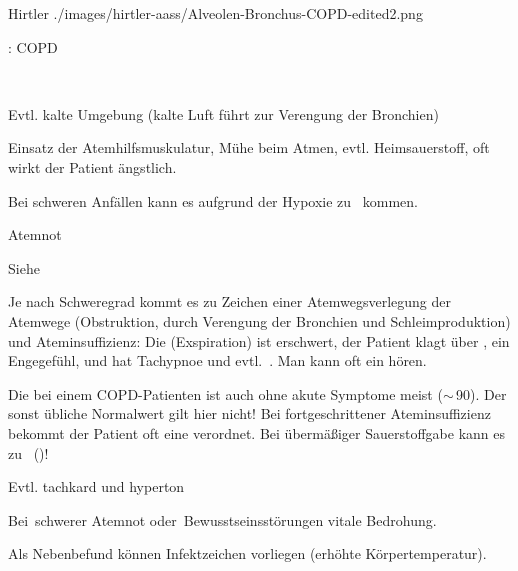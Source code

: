 {}
{\label{fig:copd-veraenderungen}}
{Hirtler}
{}
{./images/hirtler-aass/Alveolen-Bronchus-COPD-edited2.png}
{}





\TextSlide
{\TxABCDE: COPD}
{~
\begin{ABCDEText}
  \item[\ABCDE{1}] Evtl. kalte Umgebung (kalte Luft führt
  zur Verengung der Bronchien)
  \item[\ABCDE{2}] Einsatz der Atemhilfsmuskulatur, Mühe
  beim Atmen, evtl. Heimsauerstoff, oft wirkt der Patient
  ängstlich.
  \item[\ABCDE{3}] Bei schweren Anfällen kann es aufgrund
  der Hypoxie zu {\RedFlag}\,
  kommen.
  \item[\ABCDE{4}] Atemnot
  \item[\ABCDE{A}] Siehe 
  \item[\ABCDE{B}] Je nach Schweregrad kommt es zu Zeichen
  einer Atemwegsverlegung der 
  Atemwege  (Obstruktion, durch Verengung der Bronchien und
  Schleimproduktion) und Ateminsuffizienz:
  Die  (Exspiration) ist erschwert, der Patient klagt
  über , ein Engegefühl,  und
  hat Tachypnoe und evtl. {\RedFlag}\,. Man kann
  oft ein
  hören.
  
  Die  bei einem COPD-Patienten ist
  auch ohne akute Symptome meist 
  ($\sim$\,{90}\PC*). Der sonst übliche Normalwert
  gilt hier nicht! Bei fortgeschrittener Ateminsuffizienz
  bekommt der Patient oft eine 
  verordnet. Bei übermäßiger Sauerstoffgabe kann es zu
  {\RedFlag}\,
  ()!
  \item[\ABCDE{C}] Evtl. tachkard und hyperton
  \item[\ABCDE{=}] Bei {\RedFlag}\,schwerer Atemnot
  oder {\RedFlag}\,Bewusstseinsstörungen vitale Bedrohung.
  \item[\ABCDE{\ldots}] Als Nebenbefund können Infektzeichen
  vorliegen (erhöhte Körpertemperatur).
\end{ABCDEText}
}
